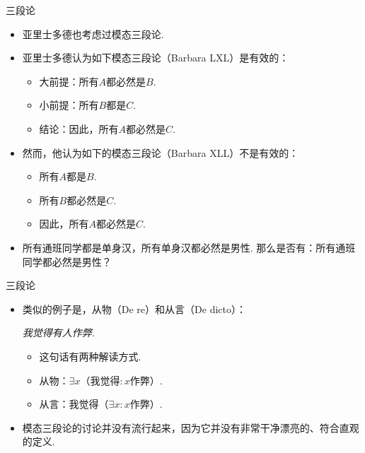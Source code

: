    \begin{frame}{三段论}
    \begin{itemize}
        \item 亚里士多德也考虑过模态三段论.
        \item 亚里士多德认为如下模态三段论（Barbara LXL）是有效的：%
        \begin{itemize}
            \item 大前提：所有$A$都必然是$B$.
            \item 小前提：所有$B$都是$C$.
            \item 结论：因此，所有$A$都必然是$C$.
        \end{itemize}
        \item 然而，他认为如下的模态三段论（Barbara XLL）不是有效的：
            \begin{itemize}
            \item 所有$A$都是$B$.
            \item 所有$B$都必然是$C$.
            \item 因此，所有$A$都必然是$C$.
        \end{itemize}
        \item 所有通班同学都是单身汉，所有单身汉都必然是男性. 那么是否有：所有通班同学都必然是男性？
    \end{itemize}
    \end{frame}
    
    \begin{frame}{三段论}
    \begin{itemize}
        \item 类似的例子是，从物（De re）和从言（De dicto）：
            \begin{center}
            \it 我觉得有人作弊.
        \end{center}
        \begin{itemize}
            \item 这句话有两种解读方式.
            \item 从物：$\exists x$（我觉得$:x$作弊）.
            \item 从言：我觉得（$\exists x:x$作弊）.
        \end{itemize}
        \item 模态三段论的讨论并没有流行起来，因为它并没有非常干净漂亮的、符合直观的定义.
    \end{itemize}
    \end{frame}
    

